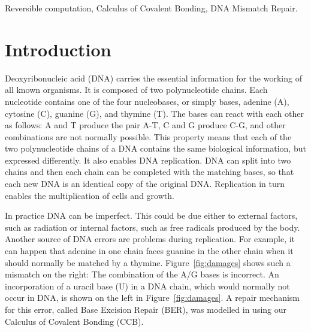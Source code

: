\documentclass[review]{elsarticle}
\begin{document}
\begin{frontmatter}
\begin{keyword}Reversible computation, Calculus of Covalent Bonding, DNA Mismatch Repair.
\end{keyword}

\end{frontmatter}

\linenumbers

\section{Introduction}

Deoxyribonucleic acid (DNA) carries the essential information for the working of all known organisms. It is composed of two polynucleotide chains. Each nucleotide contains one of the four nucleobases, or simply bases,  adenine (A), cytosine (C), guanine (G), and thymine (T). 
The bases can react with each other as follows: A and T produce the pair A-T, C and G produce C-G,
and other combinations are not normally possible. This property means that each of the two polynucleotide chains of a DNA contains the same biological information, but expressed differently. It also enables DNA replication. 
DNA can split into two chains and then each chain can be completed with the matching bases, so that each new DNA is an identical copy of the original DNA. Replication in turn enables the multiplication of cells and growth.

In practice DNA can be imperfect. This could be due either to external factors, such as radiation 
or internal factors, such as free radicals produced by the body. Another source of DNA errors are problems during replication. For example, it can happen that adenine in one chain faces guanine in the other chain when it should normally be matched by a thymine. Figure~\ref{fig:damages} shows such a mismatch on the right: The combination of the A/G bases is incorrect. An incorporation of a uracil base (U) in a DNA chain, which would normally not occur in DNA, is shown on the left in Figure~\ref{fig:damages}. A repair mechanism for this error, called Base Excision Repair (BER), was modelled in \cite{10.1007/978-3-319-99498-7_8} using our Calculus of Covalent Bonding (CCB).
\end{document}
